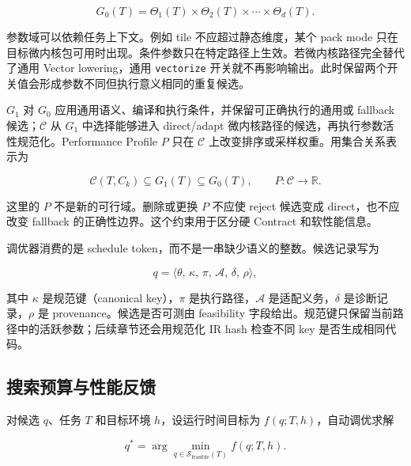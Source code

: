 \begin{equation}
G_0(T)
=
\Theta_1(T)\times\Theta_2(T)\times\cdots\times\Theta_d(T).
\label{eq:chapter2-g0}
\end{equation}

参数域可以依赖任务上下文。例如 tile 不应超过静态维度，某个 pack mode 只在目标微内核包可用时出现。条件参数只在特定路径上生效。若微内核路径完全替代了通用 Vector lowering，通用 \texttt{vectorize} 开关就不再影响输出。此时保留两个开关值会形成参数不同但执行意义相同的重复候选。

$G_1$ 对 $G_0$ 应用通用语义、编译和执行条件，并保留可正确执行的通用或 fallback 候选；$\mathcal{C}$ 从 $G_1$ 中选择能够进入 direct/adapt 微内核路径的候选，再执行参数活性规范化。Performance Profile $P$ 只在 $\mathcal{C}$ 上改变排序或采样权重。用集合关系表示为

\begin{equation}
\mathcal{C}(T,C_k)
\subseteq
G_1(T)
\subseteq
G_0(T),
\qquad
P:\mathcal{C}\rightarrow\mathbb{R}.
\label{eq:chapter2-space-relation}
\end{equation}

这里的 $P$ 不是新的可行域。删除或更换 $P$ 不应使 reject 候选变成 direct，也不应改变 fallback 的正确性边界。这个约束用于区分硬 Contract 和软性能信息。

调优器消费的是 schedule token，而不是一串缺少语义的整数。候选记录写为

\begin{equation}
q
=
\langle
\theta,\,
\kappa,\,
\pi,\,
\mathcal{A},\,
\delta,\,
\rho
\rangle ,
\label{eq:chapter2-candidate-record}
\end{equation}

其中 $\kappa$ 是规范键（canonical key），$\pi$ 是执行路径，$\mathcal{A}$ 是适配义务，$\delta$ 是诊断记录，$\rho$ 是 provenance。候选是否可测由 feasibility 字段给出。规范键只保留当前路径中的活跃参数；后续章节还会用规范化 IR hash 检查不同 key 是否生成相同代码。

\subsection{搜索预算与性能反馈}

对候选 $q$、任务 $T$ 和目标环境 $h$，设运行时间目标为 $f(q;T,h)$，自动调优求解

\begin{equation}
q^{*}
=
\arg\min_{q\in\mathcal{S}_{\mathrm{feasible}}(T)}
f(q;T,h).
\label{eq:chapter2-tuning-objective}
\end{equation}

